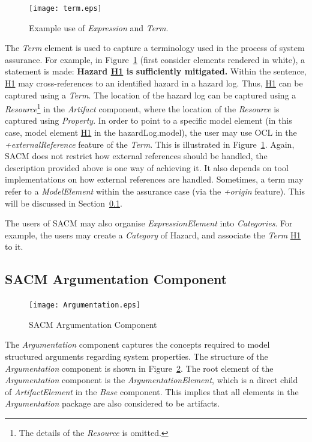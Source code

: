 \begin{figure}
	\centering
	\texttt{[image: term.eps]}
	\caption{Example use of \textit{Expression} and \textit{Term}.}
	\label{fig:termExample}
\end{figure}

The \textit{Term} element is used to capture a terminology used in the process of system assurance. 
For example, in Figure~\ref{fig:termExample} (first consider elements rendered in white), a statement is made: \textbf{Hazard \underline {H1} is sufficiently mitigated.} 
Within the sentence, \underline{H1} may cross-references to an identified hazard in a hazard log. 
Thus, \underline{H1} can be captured using a \textit{Term}. 
The location of the hazard log can be captured using a \textit{Resource}\footnote{The details of the \textit{Resource} is omitted.} in the \textit{Artifact} component, where the location of the \textit{Resource} is captured using \textit{Property}. 
In order to point to a specific model element (in this case, model element \underline{H1} in the hazardLog.model), the user may use OCL in the \textit{+externalReference} feature of the \textit{Term}. 
This is illustrated in Figure~\ref{fig:termExample}.
Again, SACM does not restrict how external references should be handled, the description provided above is one way of achieving it. 
It also depends on tool implementations on how external references are handled. 
Sometimes, a term may refer to a \textit{ModelElement} within the assurance case (via the \textit{+origin} feature). 
This will be discussed in Section~\ref{sec:argPack}.

The users of SACM may also organise \textit{ExpressionElement} into \textit{Categories}. 
For example, the users may create a \textit{Category} of Hazard, and associate the \textit{Term} \underline{H1} to it. 

\subsection{SACM Argumentation Component}
\label{sec:argPack}
\begin{figure}
	\centering
	\texttt{[image: Argumentation.eps]}
	\caption{SACM Argumentation Component}
	\label{fig:arg}
\end{figure}
The \textit{Argumentation} component captures the concepts required to model structured arguments regarding system properties. 
The structure of the \textit{Argumentation} component is shown in Figure~\ref{fig:arg}.
The root element of the \textit{Argumentation} component is the \textit{ArgumentationElement}, which is a direct child of \textit{ArtifactElement} in the \textit{Base} component. 
This implies that all elements in the \textit{Argumentation} package are also considered to be artifacts. 


